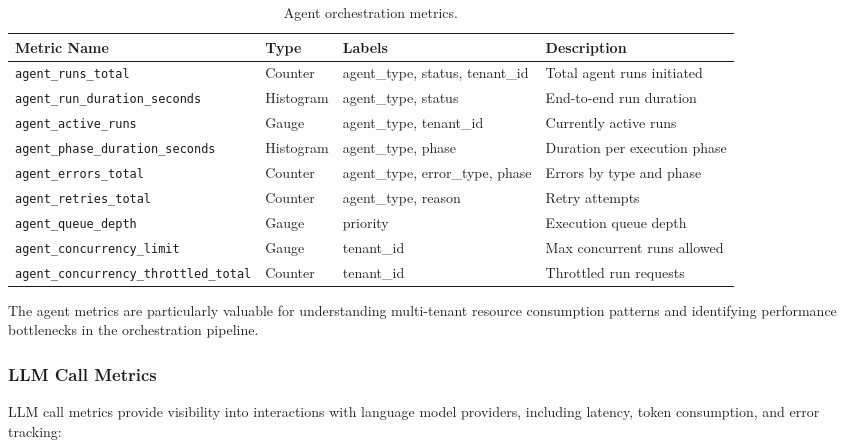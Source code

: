 \begin{table}[ht]
\centering
\caption{Agent orchestration metrics.}
\label{tab:agent-metrics}
\small
\begin{tabularx}{\textwidth}{lllX}
\hline
\textbf{Metric Name} & \textbf{Type} & \textbf{Labels} & \textbf{Description} \\
\hline
\texttt{agent\_runs\_total} & Counter & agent\_type, status, tenant\_id & Total agent runs initiated \\
\texttt{agent\_run\_duration\_seconds} & Histogram & agent\_type, status & End-to-end run duration \\
\texttt{agent\_active\_runs} & Gauge & agent\_type, tenant\_id & Currently active runs \\
\texttt{agent\_phase\_duration\_seconds} & Histogram & agent\_type, phase & Duration per execution phase \\
\texttt{agent\_errors\_total} & Counter & agent\_type, error\_type, phase & Errors by type and phase \\
\texttt{agent\_retries\_total} & Counter & agent\_type, reason & Retry attempts \\
\texttt{agent\_queue\_depth} & Gauge & priority & Execution queue depth \\
\texttt{agent\_concurrency\_limit} & Gauge & tenant\_id & Max concurrent runs allowed \\
\texttt{agent\_concurrency\_throttled\_total} & Counter & tenant\_id & Throttled run requests \\
\hline
\end{tabularx}
\end{table}

The agent metrics are particularly valuable for understanding multi-tenant resource consumption patterns and identifying performance bottlenecks in the orchestration pipeline.

\subsubsection{LLM Call Metrics}

LLM call metrics provide visibility into interactions with language model providers, including latency, token consumption, and error tracking:

